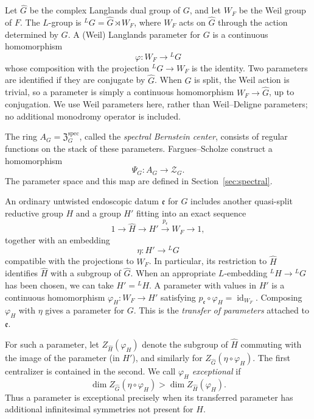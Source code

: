 \documentclass[11pt,a4paper]{amsart}
\newcommand{\mcZ}{\mathcal Z}
\newcommand{\Zspec}{\mathfrak Z^{\mathrm{spec}}}
\theoremstyle{definition}
\theoremstyle{remark}
\begin{document}
Let $\widehat G$ be the complex Langlands dual group of $G$, and let
$W_F$ be the Weil group of $F$. The $L$-group is
${}^LG=\widehat G\rtimes W_F$, where $W_F$ acts on $\widehat G$
through the action determined by $G$. A (Weil) Langlands parameter
for $G$ is a continuous homomorphism
$$
 \varphi:W_F\longrightarrow{}^LG
$$
whose composition with the projection ${}^LG\to W_F$ is the identity.
Two parameters are identified if they are conjugate by $\widehat G$.
When $G$ is split, the Weil action is trivial, so a parameter is simply
a continuous homomorphism $W_F\to\widehat G$, up to conjugation.
We use Weil parameters here, rather than Weil--Deligne parameters;
no additional monodromy operator is included.

The ring $A_G=\Zspec_G$, called the \emph{spectral Bernstein center},
consists of regular functions on the stack of these parameters.
Fargues--Scholze construct a homomorphism
$$
 \Psi_G:A_G\longrightarrow\mcZ_G.
$$
The parameter space and this map are defined in
Section~\ref{sec:spectral}.

An ordinary untwisted endoscopic datum $\mathfrak e$ for $G$ includes
another quasi-split reductive group $H$ and a group
$H'$ fitting into an exact sequence
$$
 1\longrightarrow\widehat H\longrightarrow H'
 \xrightarrow{p_{\mathfrak e}}W_F\longrightarrow1,
$$
together with an embedding
$$
 \eta:H'\longrightarrow{}^LG
$$
compatible with the projections to $W_F$. In particular, its restriction
to $\widehat H$ identifies $\widehat H$ with a subgroup of $\widehat G$.
When an appropriate $L$-embedding ${}^LH\to{}^LG$ has been chosen,
we can take $H'={}^LH$.
A parameter with values in $H'$ is a continuous
homomorphism $\varphi_H:W_F\to H'$ satisfying
$p_{\mathfrak e}\circ\varphi_H=\operatorname{id}_{W_F}$.
Composing $\varphi_H$ with $\eta$ gives a parameter for $G$.
This is the \emph{transfer of parameters} attached to $\mathfrak e$.

For such a parameter, let $Z_{\widehat H}(\varphi_H)$ denote the
subgroup of $\widehat H$ commuting with the image of the parameter
(in $H'$), and similarly for
$Z_{\widehat G}(\eta\circ\varphi_H)$. The first centralizer is
contained in the second. We call $\varphi_H$ \emph{exceptional} if
$$
 \dim Z_{\widehat G}(\eta\circ\varphi_H)
       >\dim Z_{\widehat H}(\varphi_H).
$$
Thus a parameter is exceptional precisely when its transferred
parameter has additional infinitesimal symmetries not present for $H$.
\end{document}
